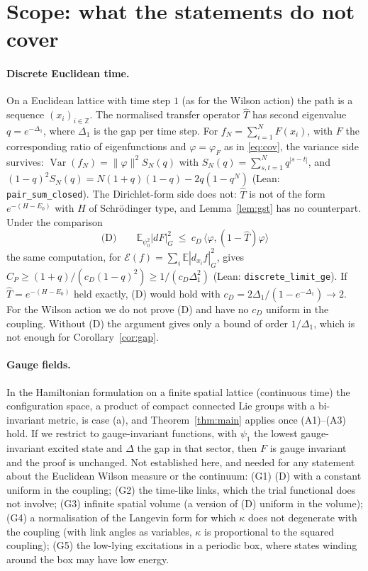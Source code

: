 \documentclass[11pt,a4paper]{article}
\theoremstyle{definition}
\theoremstyle{remark}
\newcommand{\E}{\mathbb{E}}
\newcommand{\Var}{\operatorname{Var}}
\newcommand{\cE}{\mathcal{E}}
\newcommand{\code}[1]{\texttt{#1}}
\begin{document}
\section{Scope: what the statements do not cover}\label{sec:scope}

\paragraph{Discrete Euclidean time.}
On a Euclidean lattice with time step $1$ (as for the Wilson action) the path is a sequence $(x_i)_{i\in\mathbb Z}$.
The normalised transfer operator $\hat T$ has second eigenvalue $q=e^{-\Delta_1}$, where $\Delta_1$ is the gap per time step.
For $f_N=\sum_{i=1}^NF(x_i)$, with $F$ the corresponding ratio of eigenfunctions and $\varphi=\varphi_F$ as in \eqref{eq:cov}, the variance side survives: $\Var(f_N)=\|\varphi\|^2S_N(q)$ with $S_N(q)=\sum_{s,t=1}^Nq^{|s-t|}$, and $(1-q)^2S_N(q)=N(1+q)(1-q)-2q(1-q^N)$ (Lean: \code{pair\_sum\_closed}).
The Dirichlet-form side does not: $\hat T$ is not of the form $e^{-(H-E_0)}$ with $H$ of Schr\"odinger type, and Lemma~\ref{lem:gst} has no counterpart.
Under the comparison
\[
  \text{(D)}\qquad \E_{\psi_0^2}|dF|^2_G\ \le\ c_D\,\bigl\langle\varphi,(1-\hat T)\varphi\bigr\rangle
\]
the same computation, for $\cE(f)=\sum_i\E|d_{x_i}f|^2_G$, gives $C_P\ge(1+q)/(c_D(1-q)^2)\ge1/(c_D\Delta_1^2)$ (Lean: \code{discrete\_limit\_ge}).
If $\hat T=e^{-(H-E_0)}$ held exactly, (D) would hold with $c_D=2\Delta_1/(1-e^{-\Delta_1})\to2$.
For the Wilson action we do not prove (D) and have no $c_D$ uniform in the coupling.
Without (D) the argument gives only a bound of order $1/\Delta_1$, which is not enough for Corollary~\ref{cor:gap}.

\paragraph{Gauge fields.}
In the Hamiltonian formulation on a finite spatial lattice (continuous time) the configuration space, a product of compact connected Lie groups with a bi-invariant metric, is case (a), and Theorem~\ref{thm:main} applies once (A1)--(A3) hold.
If we restrict to gauge-invariant functions, with $\psi_1$ the lowest gauge-invariant excited state and $\Delta$ the gap in that sector, then $F$ is gauge invariant and the proof is unchanged.
Not established here, and needed for any statement about the Euclidean Wilson measure or the continuum: (G1) (D) with a constant uniform in the coupling; (G2) the time-like links, which the trial functional does not involve; (G3) infinite spatial volume (a version of (D) uniform in the volume); (G4) a normalisation of the Langevin form for which $\kappa$ does not degenerate with the coupling (with link angles as variables, $\kappa$ is proportional to the squared coupling); (G5) the low-lying excitations in a periodic box, where states winding around the box may have low energy.
\end{document}
